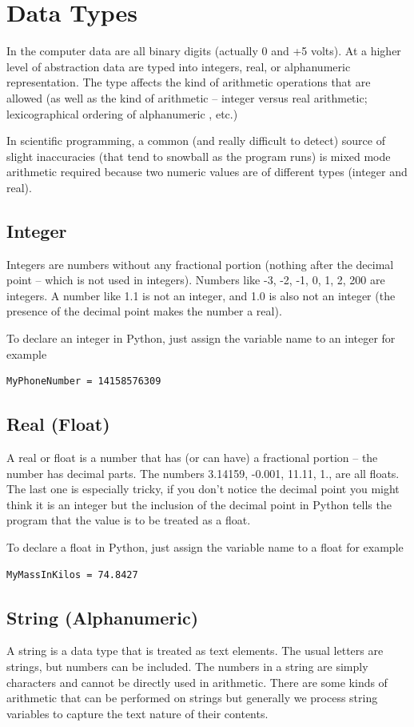 \section{Data Types}
In the computer data are all binary digits (actually 0 and +5 volts).  At a higher level of abstraction data are typed into integers, real, or alphanumeric representation.  The type affects the kind of arithmetic operations that are allowed (as well as the kind of arithmetic -- integer versus real arithmetic; lexicographical ordering of alphanumeric , etc.)

In scientific programming, a common (and really difficult to detect) source of slight inaccuracies (that tend to snowball as the program runs) is mixed mode arithmetic required because two numeric values are of different types (integer and real).

\subsection{Integer}
Integers are numbers without any fractional portion (nothing after the decimal point -- which is not used in integers).  Numbers like -3, -2, -1, 0, 1, 2, 200 are integers.   A number like 1.1 is not an integer, and 1.0 is also not an integer (the presence of the decimal point makes the number a real).

To declare an integer in Python, just assign the variable name to an integer for example
\begin{verbatim}
MyPhoneNumber = 14158576309  
\end{verbatim}

\subsection{Real (Float)}
A real or float is a number that has (or can have) a fractional portion -- the number has decimal parts. The numbers 3.14159, -0.001, 11.11, 1., are all floats.   The last one is especially tricky, if you don't notice the decimal point you might think it is an integer but the inclusion of the decimal point in Python tells the program that the value is to be treated as a float.

To declare a float in Python, just assign the variable name to a float for example
\begin{verbatim}
MyMassInKilos = 74.8427
\end{verbatim}

\subsection{String (Alphanumeric)}
A string is a data type that is treated as text elements.  The usual letters are strings, but numbers can be included.  The numbers in a string are simply characters and cannot be directly used in arithmetic.  There are some kinds of arithmetic that can be performed on strings but generally we process string variables to capture the text nature of their contents.

